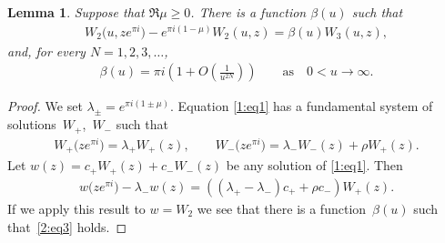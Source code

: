 \documentclass[pdftex]{sigma}
\numberwithin{equation}{section}
\newtheorem{Lemma}[Theorem]{Lemma}
{ \theoremstyle{definition}
\newtheorem{Remarks}[Theorem]{Remarks} }
\begin{document}
\begin{Lemma}\label{2:l2}
Suppose that $\Re\mu\ge 0$. There is a function $\beta(u)$ such that
\begin{gather}\label{2:eq3}
 W_2\big(u,ze^{\pi i}\big)-e^{\pi i(1-\mu)}W_2(u,z)= \beta(u) W_3(u,z) ,
\end{gather}
and, for every $N=1,2,3,\dots$,
\begin{gather}\label{2:beta}
 \beta(u)=\pi i\left(1+O\left(\frac{1}{u^{2N}}\right)\right)\qquad\text{as}\quad 0<u\to\infty.
 \end{gather}
\end{Lemma}
\begin{proof}
We set $\lambda_\pm=e^{\pi i(1\pm\mu)}$. Equation \eqref{1:eq1} has a fundamental system of solutions~$W_+$,~$W_-$ such that
\begin{gather*}
W_+\big(ze^{\pi i}\big)=\lambda_+ W_+(z),\qquad
W_-\big(ze^{\pi i}\big)=\lambda_- W_-(z)+\rho W_+(z) .
\end{gather*}
Let $w(z)=c_+W_+(z)+c_-W_-(z)$ be any solution of \eqref{1:eq1}.
Then
\begin{gather*}
w\big(ze^{\pi i}\big)-\lambda_- w(z)=((\lambda_+-\lambda_-)c_++\rho c_-) W_+(z).
\end{gather*}
If we apply this result to $w=W_2$ we see that there is a function~$\beta(u)$ such that~\eqref{2:eq3} holds.


\end{proof}
\end{document}
